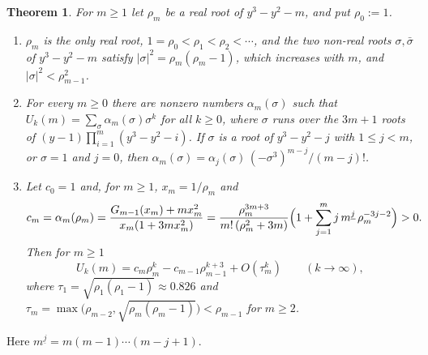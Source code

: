 \documentclass[11pt]{amsart}
\newtheorem{theorem}{Theorem}[section]
\theoremstyle{definition}
\begin{document}
\begin{theorem}\label{thm:asym}
For $m\ge1$ let $\rho_m$ be a real root of $y^3-y^2-m$, and put $\rho_0:=1$.
\begin{enumerate}
\item $\rho_m$ is the only real root, $1=\rho_0<\rho_1<\rho_2<\cdots$, and the two non-real roots $\sigma,\bar\sigma$ of $y^3-y^2-m$ satisfy $|\sigma|^2=\rho_m(\rho_m-1)$, which increases with $m$, and $|\sigma|^2<\rho_{m-1}^2$.
\item For every $m\ge0$ there are nonzero numbers $\alpha_m(\sigma)$ such that $U_k(m)=\sum_\sigma\alpha_m(\sigma)\sigma^k$ for all $k\ge0$, where $\sigma$ runs over the $3m+1$ roots of $(y-1)\prod_{i=1}^{m}(y^3-y^2-i)$. If $\sigma$ is a root of $y^3-y^2-j$ with $1\le j<m$, or $\sigma=1$ and $j=0$, then $\alpha_m(\sigma)=\alpha_j(\sigma)\,(-\sigma^3)^{m-j}/(m-j)!$.
\item Let $c_0=1$ and, for $m\ge1$, $x_m=1/\rho_m$ and
\[
  c_m=\alpha_m(\rho_m)=\frac{G_{m-1}(x_m)+mx_m^2}{x_m(1+3mx_m^2)}=\frac{\rho_m^{3m+3}}{m!\,(\rho_m^2+3m)}\Bigl(1+\sum_{j=1}^{m}j\,m^{\underline j}\,\rho_m^{-3j-2}\Bigr)>0 .
\]
Then for $m\ge1$
\[
  U_k(m)=c_m\rho_m^k-c_{m-1}\rho_{m-1}^{k+3}+O(\tau_m^k)\qquad(k\to\infty),
\]
where $\tau_1=\sqrt{\rho_1(\rho_1-1)}\approx0.826$ and $\tau_m=\max\bigl(\rho_{m-2},\sqrt{\rho_m(\rho_m-1)}\bigr)<\rho_{m-1}$ for $m\ge2$.
\end{enumerate}
\end{theorem}

Here $m^{\underline j}=m(m-1)\cdots(m-j+1)$.
\end{document}
